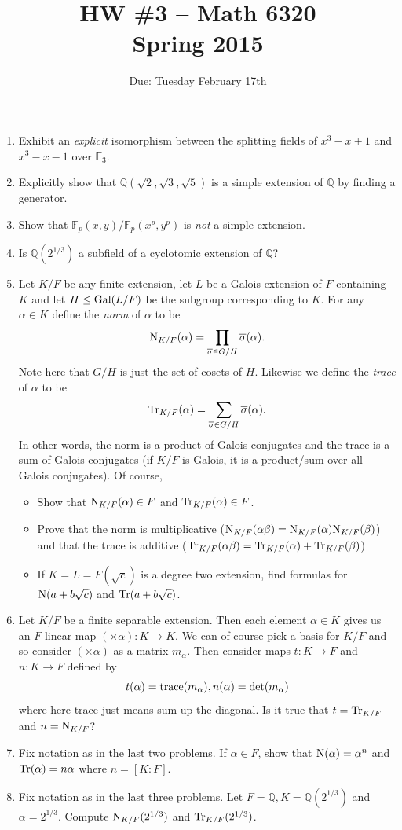 \documentclass[11pt]{amsart}
\theoremstyle{theorem}
\renewcommand{\to}[1][]{\xrightarrow{\ #1\ }}
\newcommand{\bF}{\mathbb{F}}
\newcommand{\bQ}{\mathbb{Q}}
\newcommand{\Gal}{\textnormal{Gal}}
\newcommand{\Tr}{\textnormal{Tr}}
\newcommand{\N}{\textnormal{N}}
\begin{document}
\title{HW \#3 -- Math 6320\\Spring 2015}
\author{Due: Tuesday February 17th}
\maketitle

\begin{enumerate}
\item Exhibit an \emph{explicit} isomorphism between the splitting fields of $x^3 - x + 1$ and $x^3 - x - 1$ over $\bF_3$. 
\item Explicitly show that $\bQ(\sqrt{2}, \sqrt{3}, \sqrt{5})$ is a simple extension of $\bQ$ by finding a generator.
\item Show that $\bF_p(x,y) / \bF_p(x^p, y^p)$ is \emph{not} a simple extension.   
\item Is $\bQ(2^{1/3})$ a subfield of a cyclotomic extension of $\bQ$?
\item Let $K/F$ be any finite extension, let $L$ be a Galois extension of $F$ containing $K$ and let $H \leq \Gal(L/F)$ be the subgroup corresponding to $K$.  For any $\alpha \in K$ define the \emph{norm} of $\alpha$ to be
    \[
    {\N}_{K/F}(\alpha) = \prod_{\overline{\sigma} \in G/H} \overline{\sigma}(\alpha).
    \]
    Note here that $G/H$ is just the set of cosets of $H$.  Likewise we define the \emph{trace} of $\alpha$ to be 
    \[
    {\Tr}_{K/F}(\alpha) = \sum_{\overline{\sigma} \in G/H} \overline{\sigma}(\alpha).
    \]
    In other words, the norm is a product of Galois conjugates and the trace is a sum of Galois conjugates (if $K/F$ is Galois, it is a product/sum over all Galois conjugates).  Of course,
    \begin{itemize}
    \item[(a)]  Show that $\N_{K/F}(\alpha) \in F$ and $\Tr_{K/F}(\alpha) \in F$.  
    \item[(b)]  Prove that the norm is multiplicative ($\N_{K/F}(\alpha \beta) = \N_{K/F}(\alpha) \N_{K/F}(\beta)$) and that the trace is additive ($\Tr_{K/F}(\alpha \beta) = \Tr_{K/F}(\alpha) + \Tr_{K/F}(\beta)$)
    \item[(c)]  If $K = L = F(\sqrt{c})$ is a degree two extension, find formulas for $\N(a + b\sqrt{c})$ and $\Tr(a + b \sqrt{c})$.
    \end{itemize}
\item Let $K/F$ be a finite separable extension.  Then each element $\alpha \in K$ gives us an $F$-linear map $(\times \alpha) : K \to K$.  We can of course pick a basis for $K/F$ and so consider $(\times \alpha)$ as a matrix $m_{\alpha}$.  Then consider maps $t : K \to F$ and $n : K \to F$ defined by
    \[
    t(\alpha) = {\textnormal{trace}}(m_{\alpha}), n(\alpha) = {\textnormal{det}}(m_{\alpha})
    \]
    where here trace just means sum up the diagonal.  Is it true that $t = \Tr_{K/F}$ and $n = \N_{K/F}$?
\item Fix notation as in the last two problems.  If $\alpha \in F$, show that $\N(\alpha) = \alpha^n$ and $\Tr(\alpha) = n\alpha$ where $n = [K:F]$.
\item Fix notation as in the last three problems.  Let $F = \bQ, K = \bQ(2^{1/3})$ and $\alpha = 2^{1/3}$.  Compute ${\N}_{K/F}(2^{1/3})$ and ${\Tr}_{K/F}(2^{1/3})$.
\end{enumerate}
\end{document}
